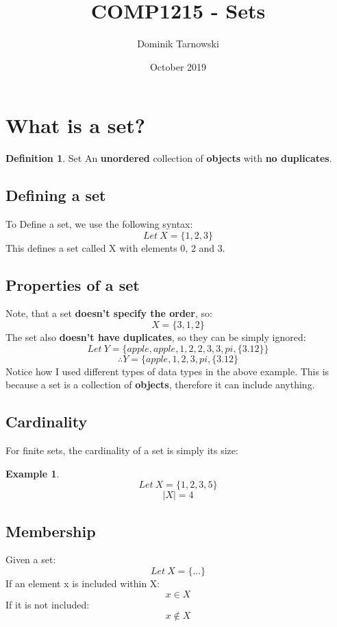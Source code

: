\documentclass{article}
\theoremstyle{definition}
\newtheorem{df}{Definition}[section]
\newtheorem{ex}{Example}[section]
\begin{document}
\title{COMP1215 - Sets}
\author{Dominik Tarnowski}
\date{October 2019}
\maketitle

\tableofcontents

\section{What is a set?}


\begin{df}{Set}
	An \textbf{unordered} collection of \textbf{objects} with \textbf{no duplicates}.
\end{df}

\subsection{Defining a set}
To Define a set, we use the following syntax:
\[ Let\ X = \{1,2,3\} \]
This defines a set called X with elements 0, 2 and 3.\\

\subsection{Properties of a set}
Note, that a set \textbf{doesn't specify the order}, so:
\[ X = \{ 3,1,2 \}\]
The set also \textbf{doesn't have duplicates}, so they can be simply ignored:
\[ Let\ Y = \{apple, apple, 1,2,2,3,3, pi, \{3.12\}\} \]
\[ \therefore Y = \{apple, 1,2,3,pi,\{3.12\}\]
Notice how I used different types of data types in the above example. This is because a set is a collection of \textbf{objects}, therefore it can include anything.

\subsection{Cardinality}
For finite sets, the cardinality of a set is simply its size:
\begin{ex}
	\[Let\ X = \{1,2,3,5\} \]
	\[|X| = 4\]
\end{ex}

\subsection{Membership}
Given a set:
\[ Let\ X = \{...\} \]
If an element x is included within X:
\[x \in X\]
If it is not included:
\[x \notin X\]
\end{document}
